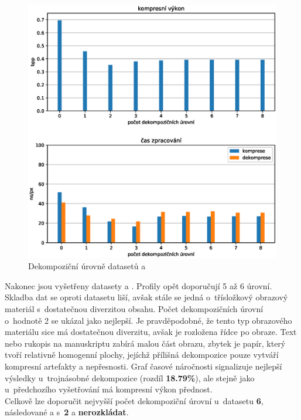 \begin{figure}[hbt!]
  \centering
  \hspace*{-0.75cm}
  \includegraphics[width=16cm]{obrazky-figures/levels/mapy_levels.eps}
  \caption{Dekompoziční úrovně datasetů  a }
\end{figure}
\noindent Nakonec jsou vyšetřeny datasety  a . Profily opět doporučují 5 až 6 úrovní. Skladba dat se oproti datasetu  liší, avšak stále se jedná o~třísložkový obrazový materiál s~dostatečnou diverzitou obsahu. Počet dekompozičních úrovní o~hodnotě 2 se ukázal jako nejlepší. Je pravděpodobné, že tento typ obrazového materiálu sice má dostatečnou diverzitu, avšak je rozložena řídce po obraze. Text nebo rukopis na manuskriptu zabírá malou část obrazu, zbytek je papír, který tvoří relativně homogenní plochy, jejíchž přílišná dekompozice pouze vytváří kompresní artefakty a nepřesnosti. Graf časové náročnosti signalizuje nejlepší výsledky u~trojnásobné dekompozice (rozdíl \textbf{18.79\%}), ale stejně jako u~předchozího vyšetřování má kompresní výkon přednost.\\
Celkově lze doporučit nejvyšší počet dekompoziční úrovní u~datasetu  \textbf{6}, následované  a  s~\textbf{2} a  \textbf{nerozkládat}.


